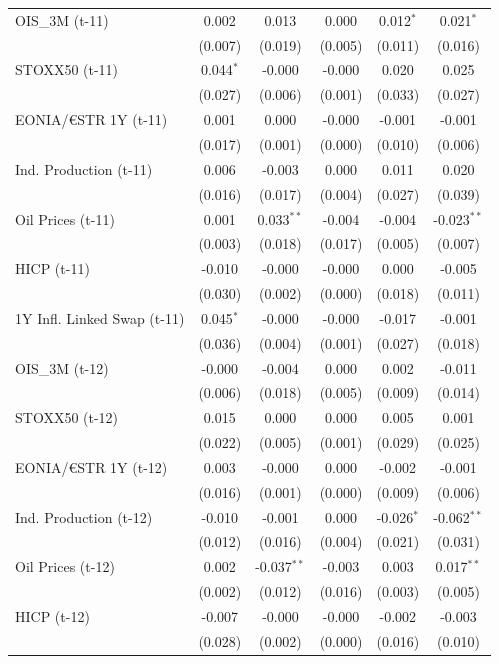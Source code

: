 \begin{longtable}[t]{lccccc}
OIS\_3M (t-11) & 0.002 & 0.013 & 0.000 & 0.012$^{*}$ & 0.021$^{*}$\\
 & (0.007) & (0.019) & (0.005) & (0.011) & (0.016)\\
STOXX50 (t-11) & 0.044$^{*}$ & -0.000 & -0.000 & 0.020 & 0.025\\
 & (0.027) & (0.006) & (0.001) & (0.033) & (0.027)\\
EONIA/€STR 1Y (t-11) & 0.001 & 0.000 & -0.000 & -0.001 & -0.001\\
 & (0.017) & (0.001) & (0.000) & (0.010) & (0.006)\\
Ind. Production (t-11) & 0.006 & -0.003 & 0.000 & 0.011 & 0.020\\
 & (0.016) & (0.017) & (0.004) & (0.027) & (0.039)\\
Oil Prices (t-11) & 0.001 & 0.033$^{**}$ & -0.004 & -0.004 & -0.023$^{**}$\\
 & (0.003) & (0.018) & (0.017) & (0.005) & (0.007)\\
HICP (t-11) & -0.010 & -0.000 & -0.000 & 0.000 & -0.005\\
 & (0.030) & (0.002) & (0.000) & (0.018) & (0.011)\\
1Y Infl. Linked Swap (t-11) & 0.045$^{*}$ & -0.000 & -0.000 & -0.017 & -0.001\\
 & (0.036) & (0.004) & (0.001) & (0.027) & (0.018)\\
OIS\_3M (t-12) & -0.000 & -0.004 & 0.000 & 0.002 & -0.011\\
 & (0.006) & (0.018) & (0.005) & (0.009) & (0.014)\\
STOXX50 (t-12) & 0.015 & 0.000 & 0.000 & 0.005 & 0.001\\
 & (0.022) & (0.005) & (0.001) & (0.029) & (0.025)\\
EONIA/€STR 1Y (t-12) & 0.003 & -0.000 & 0.000 & -0.002 & -0.001\\
 & (0.016) & (0.001) & (0.000) & (0.009) & (0.006)\\
Ind. Production (t-12) & -0.010 & -0.001 & 0.000 & -0.026$^{*}$ & -0.062$^{**}$\\
 & (0.012) & (0.016) & (0.004) & (0.021) & (0.031)\\
Oil Prices (t-12) & 0.002 & -0.037$^{**}$ & -0.003 & 0.003 & 0.017$^{**}$\\
 & (0.002) & (0.012) & (0.016) & (0.003) & (0.005)\\
HICP (t-12) & -0.007 & -0.000 & -0.000 & -0.002 & -0.003\\
 & (0.028) & (0.002) & (0.000) & (0.016) & (0.010)\\

\end{longtable}
